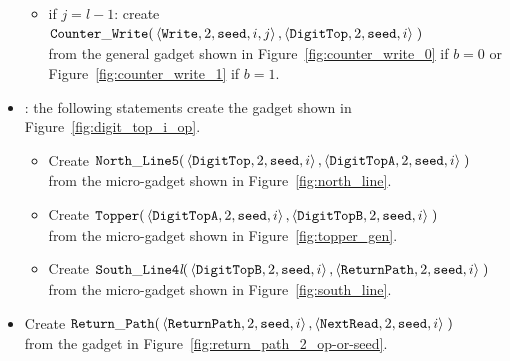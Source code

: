 \begin{itemize}
\begin{itemize}
        \item if $j = l-1$: create
        $\begin{aligned}[t]
            {\tt Counter\_Write}(&\left\langle {\tt Write}, 2, {\tt seed}, i, j \right\rangle, \left\langle {\tt DigitTop}, 2, {\tt seed}, i \right\rangle \;)
        \end{aligned}$\\from the general gadget shown in Figure~\ref{fig:counter_write_0} if $b = 0$ or Figure~\ref{fig:counter_write_1} if $b = 1$.
    \end{itemize}


    \item {\dtop}: the following statements create the gadget shown in Figure~\ref{fig:digit_top_i_op}.
    \begin{itemize}
        \item Create
        $\begin{aligned}[t]
            {\tt North\_Line5}(& \left \langle {\tt DigitTop},  2, {\tt seed}, i \right\rangle,
                                 \left \langle {\tt DigitTopA}, 2, {\tt seed}, i \right\rangle \;)
        \end{aligned}$\\ from the micro-gadget shown in Figure~\ref{fig:north_line}.

        \item Create
        $\begin{aligned}[t]
            {\tt Topper}(& \left \langle {\tt DigitTopA}, 2, {\tt seed}, i \right\rangle,
                           \left \langle {\tt DigitTopB}, 2, {\tt seed}, i \right\rangle \;)
        \end{aligned}$\\ from the micro-gadget shown in Figure~\ref{fig:topper_gen}.

        \item Create
        $\begin{aligned}[t]
            {\tt South\_Line4\textit{l}}(&\left\langle {\tt DigitTopB},  2, {\tt seed}, i \right\rangle,
                                          \left\langle {\tt ReturnPath}, 2, {\tt seed}, i \right\rangle \;)
        \end{aligned}$\\ from the micro-gadget shown in Figure~\ref{fig:south_line}.
    \end{itemize}


    \item Create
    $\begin{aligned}[t]
        {\tt Return\_Path}(&\left\langle {\tt ReturnPath}, 2, {\tt seed}, i \right\rangle,
                     \left\langle {\tt NextRead},   2, {\tt seed}, i \right\rangle \;)
    \end{aligned}$\\ from the gadget in Figure~\ref{fig:return_path_2_op-or-seed}.



\end{itemize}
